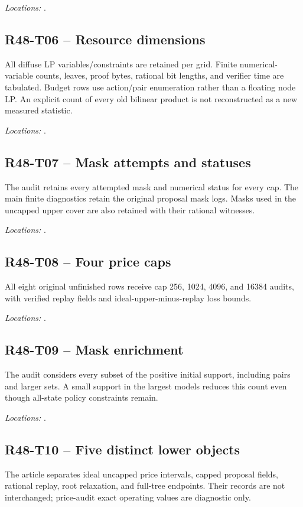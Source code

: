 \noindent\emph{Locations:} .

\subsection{R48-T06 -- Resource dimensions}
All diffuse LP variables/constraints are retained per grid. Finite numerical-variable counts, leaves, proof bytes, rational bit lengths, and verifier time are tabulated. Budget rows use action/pair enumeration rather than a floating node LP. An explicit count of every old bilinear product is not reconstructed as a new measured statistic.

\noindent\emph{Locations:} .

\subsection{R48-T07 -- Mask attempts and statuses}
The audit retains every attempted mask and numerical status for every cap. The main finite diagnostics retain the original proposal mask logs. Masks used in the uncapped upper cover are also retained with their rational witnesses.

\noindent\emph{Locations:} .

\subsection{R48-T08 -- Four price caps}
All eight original unfinished rows receive cap 256, 1024, 4096, and 16384 audits, with verified replay fields and ideal-upper-minus-replay loss bounds.

\noindent\emph{Locations:} .

\subsection{R48-T09 -- Mask enrichment}
The audit considers every subset of the positive initial support, including pairs and larger sets. A small support in the largest models reduces this count even though all-state policy constraints remain.

\noindent\emph{Locations:} .

\subsection{R48-T10 -- Five distinct lower objects}
The article separates ideal uncapped price intervals, capped proposal fields, rational replay, root relaxation, and full-tree endpoints. Their records are not interchanged; price-audit exact operating values are diagnostic only.

